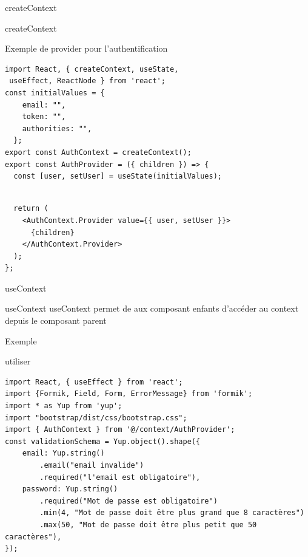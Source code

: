 \documentclass[5pt]{beamer}
\begin{document}
{\begin{frame}[fragile]{ createContext}
\begin{block}{createContext }
\end{block}
\end{frame}
\begin{frame}[fragile]{Exemple de provider pour l'authentification}
\begin{block}{ }

\begin{verbatim}
import React, { createContext, useState,
 useEffect, ReactNode } from 'react';
const initialValues = {
    email: "",
    token: "",
    authorities: "",
  };
export const AuthContext = createContext();
export const AuthProvider = ({ children }) => {
  const [user, setUser] = useState(initialValues);
  \end{verbatim}

\end{block}
\end{frame}
\begin{frame}[fragile]{}
\begin{block}{ }
\begin{verbatim}

  return (
    <AuthContext.Provider value={{ user, setUser }}>
      {children}
    </AuthContext.Provider>
  );
};

\end{verbatim}
\end{block}

\end{frame}
\begin{frame}[fragile]{useContext}
\begin{block}{useContext }
useContext permet de aux composant enfants d’accéder au context depuis le composant parent
\end{block}
\end{frame}

\begin{frame}[fragile]{Exemple}
\begin{block}{utiliser}

\begin{verbatim}
import React, { useEffect } from 'react';
import {Formik, Field, Form, ErrorMessage} from 'formik';
import * as Yup from 'yup';
import "bootstrap/dist/css/bootstrap.css";
import { AuthContext } from '@/context/AuthProvider';
const validationSchema = Yup.object().shape({
    email: Yup.string()
        .email("email invalide")
        .required("l'email est obligatoire"),
    password: Yup.string()
        .required("Mot de passe est obligatoire")
        .min(4, "Mot de passe doit être plus grand que 8 caractères")
        .max(50, "Mot de passe doit être plus petit que 50 caractères"),
});
\end{verbatim}


\end{block}
\end{frame}}
\end{document}
